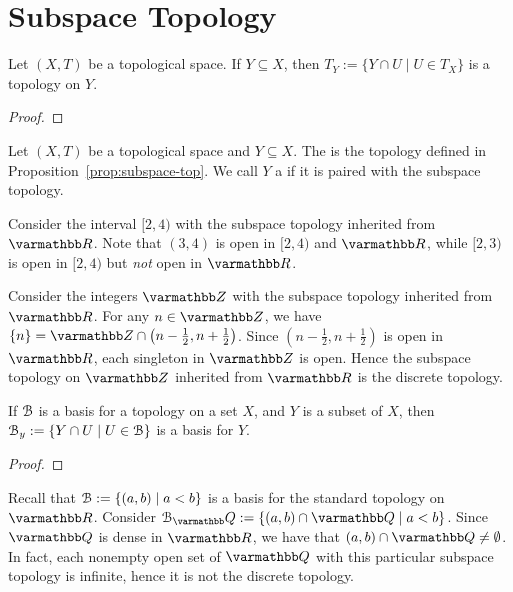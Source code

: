 \section{Subspace Topology}

\begin{proposition}\label{prop:subspace-top}
    Let $(X,T)$ be a topological space. If $Y \subseteq X$, then $T_Y := \{Y \cap U \mid U \in T_X\}$ is a topology on $Y$.
\end{proposition}
    {\color{red} \begin{proof}
        
    \end{proof}}

\begin{definition}
    Let $(X,T)$ be a topological space and $Y \subseteq X$. The  is the topology defined in Proposition~\ref{prop:subspace-top}. We call $Y$ a  if it is paired with the subspace topology.
\end{definition}

\begin{example}
    Consider the interval $[2,4)$ with the subspace topology inherited from $\bfR$. Note that $(3,4)$ is open in $[2,4)$ and $\bfR$, while $[2,3)$ is open in $[2,4)$ but \textit{not} open in $\bfR$.
\end{example}

\begin{example}
    Consider the integers $\bfZ$ with the subspace topology inherited from $\bfR$. For any $n \in \bfZ$, we have $\{n\} = \bfZ \cap \left( n - \frac{1}{2}, n+ \frac{1}{2} \right)$. Since $\left( n - \frac{1}{2}, n+ \frac{1}{2} \right)$ is open in $\bfR$, each singleton in $\bfZ$ is open. Hence the subspace topology on $\bfZ$ inherited from $\bfR$ is the discrete topology.
\end{example}

\begin{proposition}
    If $\mathcal{B}$ is a basis for a topology on a set $X$, and $Y$ is a subset of $X$, then $\mathcal{B}_y := \{Y \cap U \mid U \in \mathcal{B}\}$ is a basis for $Y$.
\end{proposition}
    {\color{red} \begin{proof}
        
    \end{proof}}

\begin{example}
    Recall that $\mathcal{B} := \{(a,b) \mid a < b\}$ is a basis for the standard topology on $\bfR$. Consider $\cB_\bfQ := \{(a,b) \cap \bfQ \mid a < b\}$. Since $\bfQ$ is dense in $\bfR$, we have that $(a,b) \cap \bfQ \neq \emptyset$. In fact, each nonempty open set of $\bfQ$ with this particular subspace topology is infinite, hence it is not the discrete topology.
\end{example}

